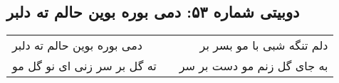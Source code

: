 \begin{center}
\section*{دوبیتی شماره ۵۳: دمی بوره بوین حالم ته دلبر}
\label{sec:053}
\begin{longtable}{l p{0.5cm} r}
دمی بوره بوین حالم ته دلبر
&&
دلم تنگه شبی با مو بسر بر
\\
ته گل بر سر زنی ای نو گل مو
&&
به جای گل زنم مو دست بر سر
\\
\end{longtable}
\end{center}
